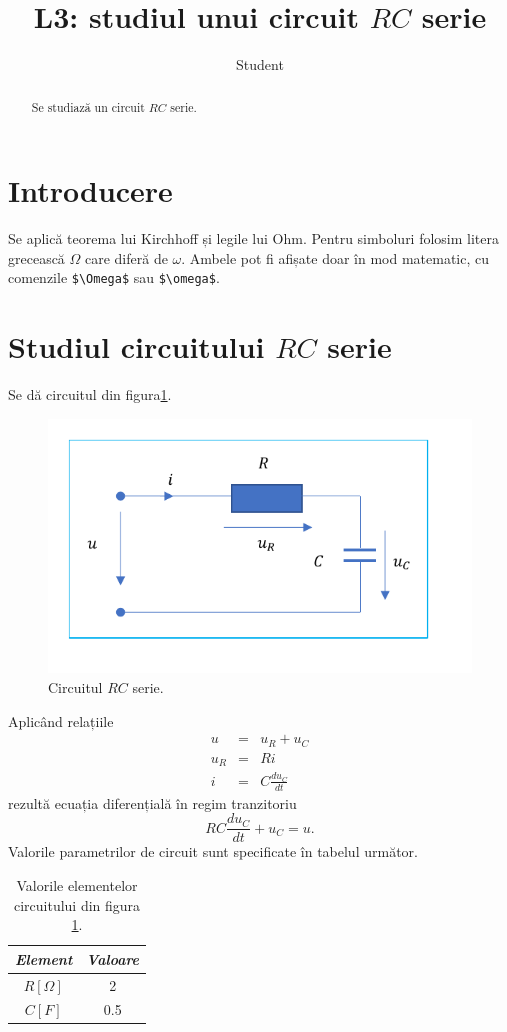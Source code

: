 \documentclass{article}
\title{L3: studiul unui circuit $RC$ serie}
\author{Student}
\begin{document}
\maketitle
\begin{abstract}
Se studiază un circuit $RC$ serie. 
\end{abstract}
\section{Introducere}
Se aplică teorema lui Kirchhoff și legile lui Ohm. Pentru simboluri folosim litera grecească $\Omega$ care diferă de $\omega$. Ambele pot fi afișate doar în mod matematic, cu comenzile \verb+$\Omega$+ sau \verb+$\omega$+.
\section{Studiul circuitului $RC$ serie}
Se dă circuitul din figura\ref{fig:rc}. \par
\begin{figure}[htpb]
\centering
\includegraphics[scale=0.8]{poza_RC.pdf}
\caption{Circuitul $RC$ serie.}\label{fig:rc}
\end{figure}
Aplicând relațiile
\begin{eqnarray}
u&=&u_R+u_C\\
u_R&=&Ri\\
i&=&C\frac{du_C}{dt}
\end{eqnarray}
rezultă ecuația diferențială în regim tranzitoriu
\begin{equation}
RC\frac{du_C}{dt}+u_C=u.
\end{equation}
Valorile parametrilor de circuit sunt specificate în tabelul următor.
\begin{table}[htpb]
\centering
\begin{tabular}{cc}
\emph{Element}&\emph{Valoare}\\\hline
$R [\Omega]$&2\\
$C[F]$&0.5\\\hline
\end{tabular}
\caption{Valorile elementelor circuitului din figura \ref{fig:rc}.}
\end{table}
\end{document}
